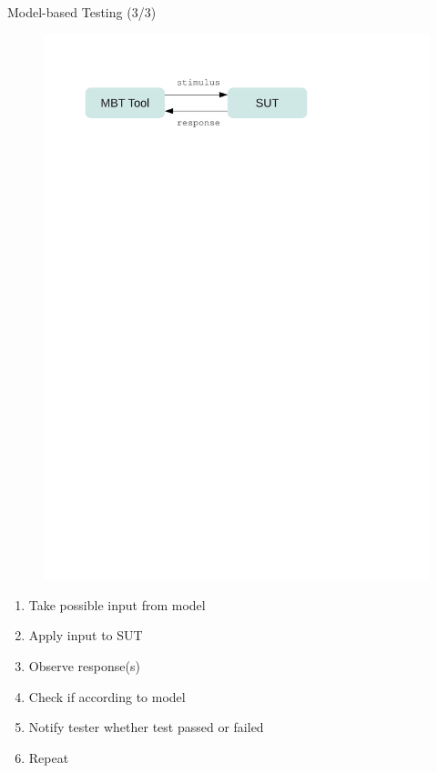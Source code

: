 \documentclass{FMTslides}
\begin{document}
\begin{frame}{Model-based Testing (3/3)}
\begin{figure}
\includegraphics[scale=0.75]{./figures/mbt.pdf}
\end{figure}
\begin{enumerate}[<+->]
\item Take possible input from model
\item Apply input to SUT
\item Observe response(s)
\item Check if according to model
\item Notify tester whether test passed or failed
\item Repeat
\end{enumerate}
\end{frame}
\end{document}
